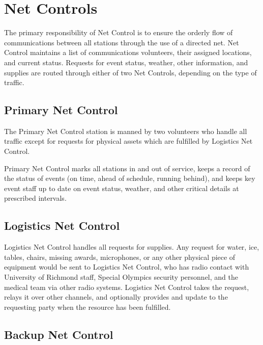 \documentclass[pdflatex,letterpaper,twoside,12pt]{book}
\begin{document}

\section{Net Controls}

The primary responsibility of Net Control is to ensure the orderly flow of communications between all stations through the use of a directed net.  Net Control maintains a list of communications volunteers, their assigned locations, and current status.  Requests for event status, weather, other information, and supplies are routed through either of two Net Controls, depending on the type of traffic.

\subsection{Primary Net Control}

The Primary Net Control station is manned by two volunteers who handle all traffic except for requests for physical assets which are fulfilled by Logistics Net Control.

Primary Net Control marks all stations in and out of service, keeps a record of the status of events (on time, ahead of schedule, running behind), and keeps key event staff up to date on event status, weather, and other critical details at prescribed intervals.

\subsection{Logistics Net Control}

Logistics Net Control handles all requests for supplies.  Any request for water, ice, tables, chairs, missing awards, microphones, or any other physical piece of equipment would be sent to Logistics Net Control, who has radio contact with University of Richmond staff, Special Olympics security personnel, and the medical team via other radio systems.  Logistics Net Control takes the request, relays it over other channels, and optionally provides and update to the requesting party when the resource has been fulfilled.

\subsection{Backup Net Control}
\end{document}
